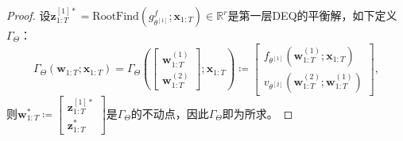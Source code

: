 \documentclass[cn,hazy,cyan,11pt,normal]{elegantnote}
\begin{document}
    \begin{proof}
        设$\mathbf{z}_{1:T}^{[1]*}=\text{RootFind}(g_{\theta^{[1]}}^f;\mathbf{x}_{1:T})\in\mathbb{R}^r$是第一层DEQ的平衡解，如下定义$\Gamma_{\Theta}$：\[\Gamma_{\Theta}(\mathbf{w}_{1:T};\mathbf{x}_{1:T})=\Gamma_{\Theta}\left(\begin{bmatrix}\mathbf{w}_{1:T}^{(1)}\\\mathbf{w}_{1:T}^{(2)}\end{bmatrix};\mathbf{x}_{1:T}\right)\coloneqq\begin{bmatrix}f_{\theta^{[1]}}(\mathbf{w}_{1:T}^{(1)};\mathbf{x}_{1:T})\\v_{\theta^{[2]}}(\mathbf{w}_{1:T}^{(2)};\mathbf{w}_{1:T}^{(1)})\end{bmatrix},\]则$\mathbf{w}_{1:T}^{*}\coloneqq\begin{bmatrix}\mathbf{z}_{1:T}^{[1]*}\\\mathbf{z}_{1:T}^{*}\end{bmatrix}$是$\Gamma_{\Theta}$的不动点，因此$\Gamma_{\Theta}$即为所求。
    \end{proof}
\end{document}
